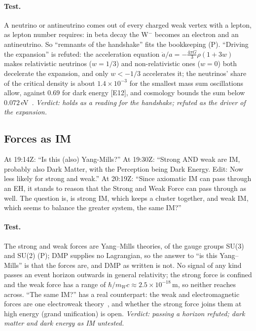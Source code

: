 \documentclass[11pt,a4paper]{article}
\theoremstyle{definition}
\theoremstyle{remark}
\newcommand{\chk}[1]{\textsf{[#1]}}
\newcommand{\tagP}{\textsf{(P)}}
\begin{document}
\paragraph{Test.} A neutrino or antineutrino comes out of every charged weak vertex with a lepton, as lepton number requires: in beta
decay the W$^-$ becomes an electron and an antineutrino. So ``remnants of the handshake'' fits the bookkeeping \tagP. ``Driving the
expansion'' is refuted: the acceleration equation $\ddot a/a=-\tfrac{4\pi G}{3}\rho(1+3w)$ makes relativistic neutrinos ($w=1/3$) and
non-relativistic ones ($w=0$) both decelerate the expansion, and only $w<-1/3$ accelerates it; the neutrinos' share of the critical density
is about $1.4\times10^{-3}$ for the smallest mass sum oscillations allow, against $0.69$ for dark energy \chk{E12}, and cosmology bounds the
sum below $0.072$\,eV~\cite{desi}. \emph{Verdict: holds as a reading for the handshake; refuted as the driver of the expansion.}

\subsection{Forces as IM}

At 19:14Z: ``Is this (also) Yang-Mills?'' At 19:30Z: ``Strong AND weak are IM, probably also Dark Matter, with the Perception being Dark
Energy. Edit: Now less likely for strong and weak.'' At 20:19Z: ``Since axiomatic IM can pass through an EH, it stands to reason that the
Strong and Weak Force can pass through as well. The question is, is strong IM, which keeps a cluster together, and weak IM, which seems to
balance the greater system, the same IM?''

\paragraph{Test.} The strong and weak forces are Yang--Mills theories, of the gauge groups SU(3) and SU(2) \tagP; DMP supplies no
Lagrangian, so the answer to ``is this Yang--Mills'' is that the forces are, and DMP as written is not. No signal of any kind passes an
event horizon outwards in general relativity; the strong force is confined and the weak force has a range of $\hbar/m_Wc\approx
2.5\times10^{-18}$\,m, so neither reaches across. ``The same IM?'' has a real counterpart: the weak and electromagnetic forces are one
electroweak theory~\cite{weinberg}, and whether the strong force joins them at high energy (grand unification) is open. \emph{Verdict:
passing a horizon refuted; dark matter and dark energy as IM untested.}
\end{document}
